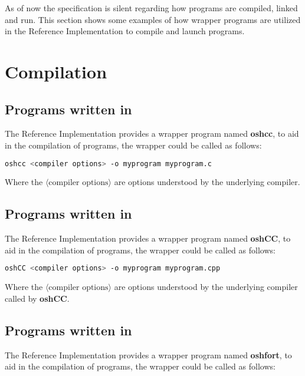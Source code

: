 
As of now the \openshmem{} specification is silent regarding how \openshmem{} programs are compiled, linked and run. This section shows some examples of
how wrapper programs are utilized in the \openshmem{} Reference Implementation to compile and launch programs.
\section{Compilation}
\subsection*{Programs written in \Clang}

The \openshmem{} Reference Implementation provides a wrapper program named \textbf{oshcc}, to aid in the compilation of \Clang{} programs, the wrapper
could be called as follows:

\begin{lstlisting}[language=bash]
oshcc <compiler options> -o myprogram myprogram.c
\end{lstlisting}
Where the $\langle\mbox{compiler options}\rangle$ are options understood by the underlying \Clang{} compiler.


\subsection*{Programs written in \Cpp}

The  \openshmem{} Reference Implementation provides a wrapper program named \textbf{oshCC}, to aid in the compilation of \Cpp{} programs, the
wrapper could be called as follows:

\begin{lstlisting}[language=bash]
oshCC <compiler options> -o myprogram myprogram.cpp
\end{lstlisting}
Where the $\langle\mbox{compiler options}\rangle$ are options understood by the underlying \Cpp{} compiler called by \textbf{oshCC}.


\subsection*{Programs written in \Fortran}

The  \openshmem{} Reference Implementation provides a wrapper program named \textbf{oshfort}, to aid in the compilation of \Fortran{} programs,
the wrapper could be called as follows:

